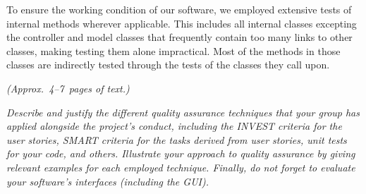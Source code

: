 To ensure the working condition of our software, we employed extensive tests of internal methods wherever applicable. 
This includes all internal classes excepting the controller and model classes that frequently contain too many links to other classes, making testing them alone impractical. Most of the methods in those classes are indirectly tested through the tests of the classes they call upon. 


\emph{(Approx.~4--7~pages of text.)}

\emph{Describe and justify the different quality assurance techniques that your group has applied alongside the project's conduct, including the INVEST criteria for the user stories, SMART criteria for the tasks derived from user stories, unit tests for your code, and others.  Illustrate your approach to quality assurance by giving relevant examples for each employed technique. Finally, do not forget to evaluate your software's interfaces (including the GUI).}

\newpage


